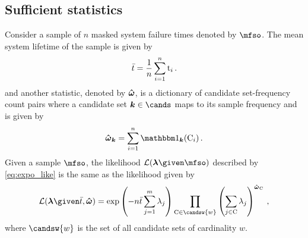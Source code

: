 \documentclass[../main.tex]{subfiles}
\begin{document}
\subsection{Sufficient statistics}
\label{sec:expo_sufficient}
Consider a sample of $n$ masked system failure times denoted by $\mfso$. The mean system lifetime of the sample is given by
\begin{equation}
    \bar{t} = \frac{1}{n} \sum_{i=1}^{n} \mathrm{t}_i\,.
\end{equation}
and another statistic, denoted by $\boldsymbol{\hat\omega}$, is a dictionary of candidate set-frequency count pairs where a candidate set $\vec{k} \in \cands$ maps to its sample frequency and is given by
\begin{equation}
    \cntsymb_{\vec{k}} = \sum_{i=1}^{n} \SetIndicator{\vec{k}}(\cand_i)\,.
\end{equation}
Given a sample $\mfso$, the likelihood $\likelihood(\vec\lambda \given \mfso)$ described by \cref{eq:expo_like} is the same as the likelihood given by
\begin{equation}
\likelihood(\vec\lambda \given \bar t, \cntsymb) =
    \exp \left( -n \bar{t} \sum_{j=1}^{m} \lambda_j \right)
    \prod_{\cand \in \candsw{w}} \left ( \sum_{j \in \cand} \lambda_j \right )^{\cntsymb_{\cand}}\,,
\end{equation}
where $\candsw{w}$ is the set of all candidate sets of cardinality $w$.
\end{document}
